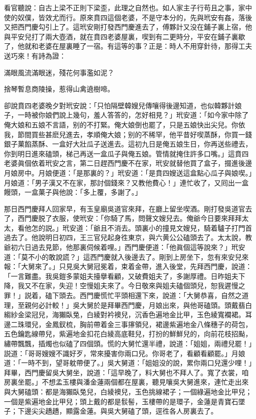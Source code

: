 看官聽說：自古上梁不正則下梁歪，此理之自然也。如人家主子行苟且之事，家中使的奴僕，皆效尤而行。原來賁四這個老婆，不是守本分的，先與玳安有姦，落後又把西門慶勾引上了。這玳安剛打發西門慶進去了，傅夥計又没在鋪子裏上宿，他與平安兒打了兩大壺酒，就在賁四老婆屋裏，喫到有二更時分，平安在鋪子裏歇了，他就和老婆在屋裏睡了一宿。有這等的事？正是：時人不用穿針待，那得工夫送巧來！有詩為證：

\begin{myquote}
滿眼風流滿眼迷，殘花何事濫如泥？

捨琴暫息商陵操，惹得山禽遶樹啼。
\end{myquote}

卻說賁四老婆晚夕對玳安說：「只怕隔壁韓嫂兒傳嚷得後邊知道，也似韓夥計娘子，一時被你娘們說上幾句，羞人答答的，怎好相見？」玳安道：「如今家中除了俺大娘和五娘不言語，别的不打緊。俺大娘倒也罷了，只是五娘快出尖兒。你依我，節間買些甚麽兒進去，孝順俺大娘；别的不稀罕，他平昔好喫蒸酥，你買一錢銀子菓餡蒸酥、一盒好大壯瓜子送進去。這初九日是俺五娘生日，你再送些禮去，你到明日進來磕頭，梯己再送一盒瓜子與俺五娘。管情就掩住許多口嘴。」這賁四老婆眞個依着玳安之言，第二日趕西門慶不在家，玳安就替他買了盒子，掇進後邊月娘房中。月娘便道：「是那裏的？」玳安道：「是賁四嫂送這盒點心瓜子與娘喫。」月娘道：「男子漢又不在家，那討個錢來？又教他費心！」連忙收了，又囘出一盒饅頭，一盒菓子與他說：「多上覆，多謝了。」

那日西門慶拜人回家早，有玉皇廟吳道官來拜，在廳上留坐喫酒。剛打發吳道官去了，西門慶脱了衣服，使玳安：「你騎了馬，問聲文嫂兒去。俺爺今日要來拜拜太太，看他怎的説。」玳安道：「爺且不消去。頭裏小的撞見文嫂兒，騎着驢子打門首過去了。他說明日初四，王三官兒起身徃東京，與六黄公公磕頭去了。太太說，教爺初六日過去見節，他那裏伺候着哩。」西門慶便道：「他眞個這等說來？」玳安道：「莫不小的敢說謊？」這西門慶就入後邊去了。剛到上房坐下，忽有來安兒來報：「大舅來了。」只見吳大舅冠冕着，束着金帶，進入後堂，先拜西門慶，說道：「一言難盡。我吳鎧多蒙姐夫擡擧看顧，又破費姐夫了，多謝厚禮。日昨姐夫下降，我又不在家，失迎！空慢姐夫來了。今日敬來與姐夫磕個頭兒，恕我遲慢之罪！」説着，磕下頭去。西門慶慌忙平頭相還下來，說道：「大舅恭喜，自然之道理，至親何必計較！」吳大舅於是拜畢西門慶，月娘出來，與他哥磕頭。頭戴翡白縐紗金梁冠兒，海獺臥兔，白綾對衿襖兒，沉香色遍地金比甲，玉色綾寬襴裙。耳邊二珠環兒，金鳳釵梳，胸前帶着金三事㩟領兒，裙邊紫遍地金八條穗子的荷包，五色鑰匙線帶兒，紫遍地金扣花白綾高底鞋兒，打扮的鮮鮮兒的，向前花枝招颭，繡帶飄飄，插燭也似磕了四個頭。慌的大舅忙還半禮，說道：「姐姐，兩禮兒罷！」説道：「哥哥嫂嫂不識好歹，常來擾害你兩口兒。你哥老了，看顧看顧罷。」月娘道：「一時不到，望哥躭帶便了。」吳大舅道：「姐姐没的說，累你兩口兒還少哩！」拜畢，西門慶留吳大舅坐，說道：「這早晚了，料大舅也不拜人了。寬了衣裳，咱房裏坐罷。」不想孟玉樓與潘金蓮兩個都在屋裏，聽見嚷吳大舅進來，連忙走出來與大舅磕頭：都是海獺臥兔兒，白綾襖兒，玉色挑線裙子；一個綠遍地金比甲兒；一個是紫遍地金比甲兒；頭上戴的都是䯼髻，玉樓帶的是環子，金蓮是青寶石墜子；下邊尖尖趫趫，顯露金蓮。與吳大舅磕了頭，逕徃各人房裏去了。

